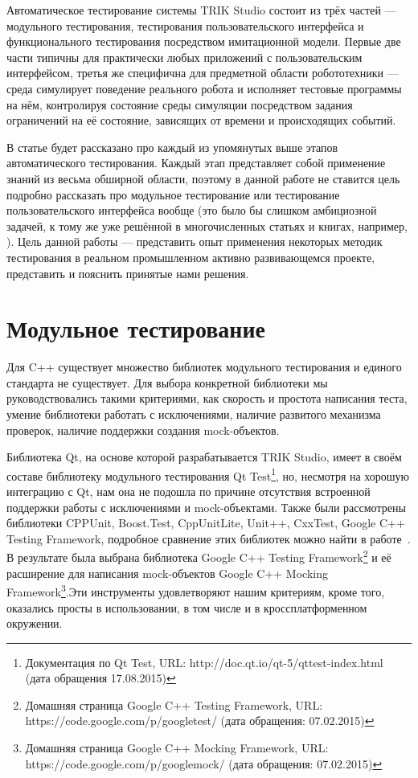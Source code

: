 \documentclass[conference]{IEEEtran}
\begin{document}
Автоматическое тестирование системы TRIK Studio состоит из трёх частей --- модульного тестирования, тестирования 
пользовательского интерфейса и функционального тестирования посредством имитационной модели. Первые две части 
типичны для практически любых приложений с пользовательским интерфейсом, третья же специфична для предметной 
области робототехники --- среда симулирует поведение реального робота и исполняет тестовые программы на нём, 
контролируя состояние среды симуляции посредством задания ограничений на её состояние, зависящих от времени и происходящих событий.

В статье будет рассказано про каждый из упомянутых выше этапов автоматического тестирования. Каждый этап 
представляет собой применение знаний из весьма обширной области, поэтому в данной работе не ставится цель подробно 
рассказать про модульное тестирование или тестирование пользовательского интерфейса вообще (это было бы слишком 
амбициозной задачей, к тому же уже решённой в многочисленных статьях и книгах, например, \cite{banerjee2013graphical, kotlyarov2006testing}). 
Цель данной работы --- представить опыт применения некоторых методик тестирования в реальном промышленном 
активно развивающемся проекте, представить и пояснить принятые нами решения.

\section{Модульное тестирование}
Для C++ существует множество библиотек модульного тестирования и единого стандарта не существует. Для выбора 
конкретной библиотеки мы руководствовались такими критериями, как скорость и простота написания теста, умение 
библиотеки работать с исключениями, наличие развитого механизма проверок, наличие поддержки создания mock-объектов. 

Библиотека Qt, на основе которой разрабатывается TRIK Studio, имеет в своём составе библиотеку модульного 
тестирования Qt Test\footnote{Документация по Qt Test, URL: http://doc.qt.io/qt-5/qttest-index.html (дата обращения 17.08.2015)}, 
но, несмотря на хорошую интеграцию с Qt, нам она не подошла по причине отсутствия встроенной поддержки работы с исключениями 
и mock-объектами. Также были рассмотрены библиотеки CPPUnit, Boost.Test, CppUnitLite, Unit++, CxxTest, Google C++ Testing Framework, 
подробное сравнение этих библиотек можно найти в работе~\cite{bazhutin2012course}. В результате была выбрана 
библиотека Google C++ Testing Framework\footnote{Домашняя страница Google C++ Testing Framework, URL: https://code.google.com/p/googletest/ (дата обращения: 07.02.2015)} 
и её расширение для написания mock-объектов Google C++ Mocking Framework\footnote{Домашняя страница Google C++ Mocking Framework, URL: https://code.google.com/p/googlemock/ (дата обращения: 07.02.2015)}.Эти инструменты удовлетворяют нашим критериям, кроме того, оказались просты в использовании, в том числе и в кроссплатформенном окружении. 
\end{document}
